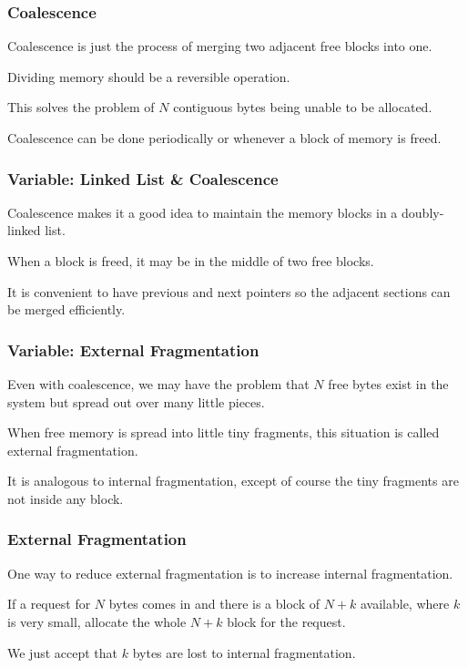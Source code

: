 \begin{frame}
\frametitle{Coalescence}

Coalescence is just the process of merging two adjacent free blocks into one. 

Dividing memory should be a reversible operation. 

This solves the problem of $N$ contiguous bytes being unable to be allocated. 

Coalescence can be done periodically or whenever a block of memory is freed.


\end{frame}

\begin{frame}
\frametitle{Variable: Linked List \& Coalescence}

Coalescence makes it a good idea to maintain the memory blocks in a doubly-linked list.

When a block is freed, it may be in the middle of two free blocks. 

It is convenient to have previous and next pointers so the adjacent sections can be merged efficiently.


\end{frame}

\begin{frame}
\frametitle{Variable: External Fragmentation}

Even with coalescence, we may have the problem that $N$ free bytes exist in the system but spread out over many little pieces.

When free memory is spread into little tiny fragments, this situation is called \alert{external fragmentation}. 

It is analogous to internal fragmentation, except of course the tiny fragments are not inside any block.


\end{frame}

\begin{frame}
\frametitle{External Fragmentation}

One way to reduce external fragmentation is to increase internal fragmentation. 

If a request for $N$ bytes comes in and there is a block of $N+k$ available, where $k$ is very small, allocate the whole $N+k$ block for the request.

We just accept that $k$ bytes are lost to internal fragmentation.

\end{frame}

